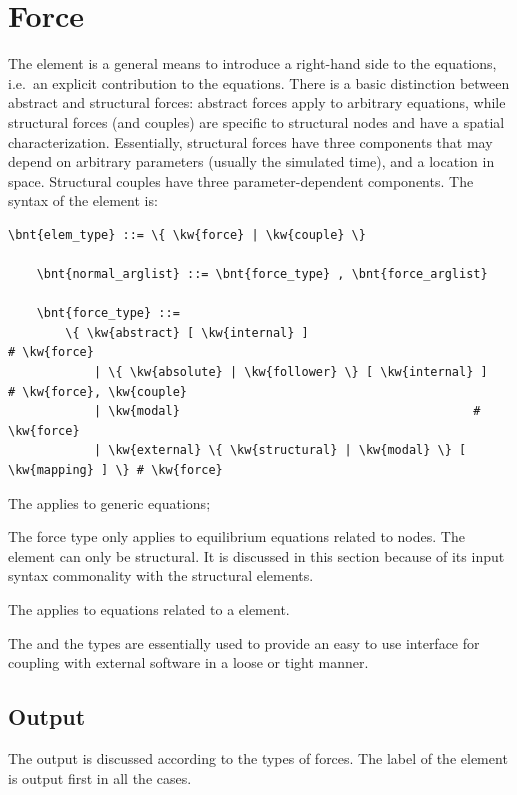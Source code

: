 \section{Force}\label{sec:EL:FORCE}
The  element is a general means to introduce 
a right-hand side to the equations, i.e.\ an explicit contribution
to the equations.
There is a basic distinction between abstract and structural forces:
abstract forces apply to arbitrary equations, while structural forces
(and couples) are specific to structural nodes and have
a spatial characterization.
Essentially, structural forces have three components
that may depend on arbitrary parameters (usually the simulated time),
and a location in space.
Structural couples have three parameter-dependent components.
The syntax of the  element is:
\begin{Verbatim}[commandchars=\\\{\}]
    \bnt{elem_type} ::= \{ \kw{force} | \kw{couple} \}

    \bnt{normal_arglist} ::= \bnt{force_type} , \bnt{force_arglist}

    \bnt{force_type} ::=
        \{ \kw{abstract} [ \kw{internal} ]                             # \kw{force}
            | \{ \kw{absolute} | \kw{follower} \} [ \kw{internal} ]          # \kw{force}, \kw{couple}
            | \kw{modal}                                         # \kw{force}
            | \kw{external} \{ \kw{structural} | \kw{modal} \} [ \kw{mapping} ] \} # \kw{force}
\end{Verbatim}
The   applies to generic equations;

The  force type only applies to equilibrium equations
related to  nodes.
The  element can only be structural.
It is discussed in this section because of its input syntax commonality 
with the structural  elements.

The   applies to equations related
to a  element.

The  and the  types
are essentially used to provide an easy to use interface
for coupling with external software in a loose or tight manner.

\subsection{Output}
The output is discussed according to the types of forces. 
The label of the element is output first in all the cases.

